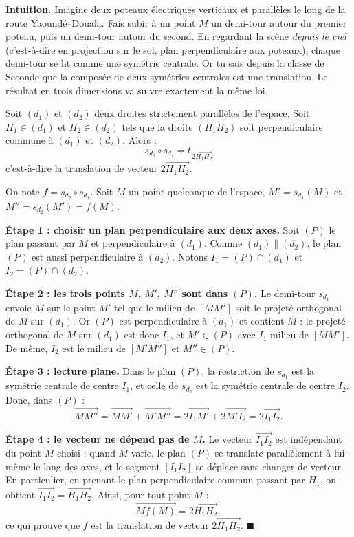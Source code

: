 \documentclass[11pt]{article}
\newcommand{\cle}[1]{{\popxbold\color{popdark}#1}}
\begin{document}
\textbf{Intuition.} Imagine deux poteaux électriques verticaux et parallèles le long de la route Yaoundé--Douala. Fais subir à un point $M$ un demi-tour autour du premier poteau, puis un demi-tour autour du second. En regardant la scène \emph{depuis le ciel} (c'est-à-dire en projection sur le sol, plan perpendiculaire aux poteaux), chaque demi-tour se lit comme une symétrie centrale. Or tu sais depuis la classe de Seconde que la composée de deux symétries centrales est une translation. Le résultat en trois dimensions va suivre exactement la même loi.

\begin{propriete}
Soit $(d_1)$ et $(d_2)$ deux droites strictement parallèles de l'espace. Soit $H_1 \in (d_1)$ et $H_2 \in (d_2)$ tels que la droite $(H_1H_2)$ soit perpendiculaire commune à $(d_1)$ et $(d_2)$. Alors :
\[ s_{d_2} \circ s_{d_1} = t_{\,2\overrightarrow{H_1H_2}} \]
c'est-à-dire la \cle{translation} de vecteur $2\overrightarrow{H_1H_2}$.
\end{propriete}

\begin{experience}
On note $f = s_{d_2} \circ s_{d_1}$. Soit $M$ un point quelconque de l'espace, $M' = s_{d_1}(M)$ et $M'' = s_{d_2}(M') = f(M)$.

\textbf{Étape 1 : choisir un plan perpendiculaire aux deux axes.} Soit $(P)$ le plan passant par $M$ et perpendiculaire à $(d_1)$. Comme $(d_1) \parallel (d_2)$, le plan $(P)$ est aussi perpendiculaire à $(d_2)$. Notons $I_1 = (P) \cap (d_1)$ et $I_2 = (P) \cap (d_2)$.

\textbf{Étape 2 : les trois points $M$, $M'$, $M''$ sont dans $(P)$.} Le demi-tour $s_{d_1}$ envoie $M$ sur le point $M'$ tel que le milieu de $[MM']$ soit le projeté orthogonal de $M$ sur $(d_1)$. Or $(P)$ est perpendiculaire à $(d_1)$ et contient $M$ : le projeté orthogonal de $M$ sur $(d_1)$ est donc $I_1$, et $M' \in (P)$ avec $I_1$ milieu de $[MM']$. De même, $I_2$ est le milieu de $[M'M'']$ et $M'' \in (P)$.

\textbf{Étape 3 : lecture plane.} Dans le plan $(P)$, la restriction de $s_{d_1}$ est la symétrie centrale de centre $I_1$, et celle de $s_{d_2}$ est la symétrie centrale de centre $I_2$. Donc, dans $(P)$ :
\[ \overrightarrow{MM''} = \overrightarrow{MM'} + \overrightarrow{M'M''} = 2\overrightarrow{I_1M'} + 2\overrightarrow{M'I_2} = 2\overrightarrow{I_1I_2}. \]

\textbf{Étape 4 : le vecteur ne dépend pas de $M$.} Le vecteur $\overrightarrow{I_1I_2}$ est indépendant du point $M$ choisi : quand $M$ varie, le plan $(P)$ se translate parallèlement à lui-même le long des axes, et le segment $[I_1I_2]$ se déplace sans changer de vecteur. En particulier, en prenant le plan perpendiculaire commun passant par $H_1$, on obtient $\overrightarrow{I_1I_2} = \overrightarrow{H_1H_2}$. Ainsi, pour tout point $M$ :
\[ \overrightarrow{Mf(M)} = 2\overrightarrow{H_1H_2}, \]
ce qui prouve que $f$ est la translation de vecteur $2\overrightarrow{H_1H_2}$. $\blacksquare$
\end{experience}
\end{document}
